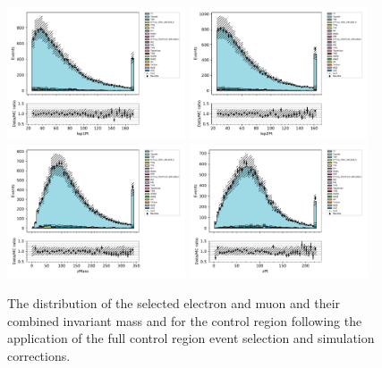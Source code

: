 \begin{figure}[tbp]
\centering
\includegraphics[width=0.47\textwidth]{figs/tzq-fullSelection-plots/plots_emu/lep1Pt.pdf}
\includegraphics[width=0.47\textwidth]{figs/tzq-fullSelection-plots/plots_emu/lep2Pt.pdf}
\\
\includegraphics[width=0.47\textwidth]{figs/tzq-fullSelection-plots/plots_emu/zMass.pdf}
\includegraphics[width=0.47\textwidth]{figs/tzq-fullSelection-plots/plots_emu/zPt.pdf}
\caption{
The distribution of the selected electron and muon \pT and their combined invariant mass and \pt for the \ttbar control region following the application of the full control region event selection and simulation corrections.
}
\label{fig:ttbarCR_leptons}
\end{figure}


